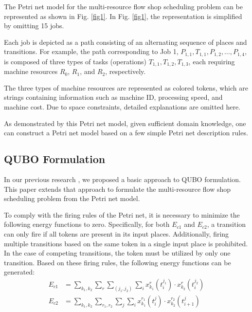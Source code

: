 \documentclass[conference]{IEEEtran}
\begin{document}
The Petri net model for the multi-resource flow shop scheduling problem can be represented as shown in Fig. \ref{fig1}. In Fig. \ref{fig1}, the representation is simplified by omitting 15 jobs.

Each job is depicted as a path consisting of an alternating sequence of places and transitions. For example, the path corresponding to Job 1, $P_{1,1}, T_{1,1}, P_{1,2}, \ldots, P_{1,4}$, is composed of three types of tasks (operations) $T_{1,1}, T_{1,2}, T_{1,3}$, each requiring machine resources $R_0$, $R_1$, and $R_2$, respectively.

The three types of machine resources are represented as colored tokens, which are strings containing information such as machine ID, processing speed, and machine cost. Due to space constraints, detailed explanations are omitted here.

As demonstrated by this Petri net model, given sufficient domain knowledge, one can construct a Petri net model based on a few simple Petri net description rules.

\subsection{QUBO Formulation}

In our previous research \cite{b2}, we proposed a basic approach to QUBO formulation. This paper extends that approach to formulate the multi-resource flow shop scheduling problem from the Petri net model.

To comply with the firing rules of the Petri net, it is necessary to minimize the following energy functions to zero. Specifically, for both $E_{c1}$ and $E_{c2}$, a transition can only fire if all tokens are present in its input places. Additionally, firing multiple transitions based on the same token in a single input place is prohibited. In the case of competing transitions, the token must be utilized by only one transition. Based on these firing rules, the following energy functions can be generated: 
\begin{align} 
E_{c1} &= \sum_{k_1,k_2} \sum_r \sum_{(j_1,j_2)} \sum_i x_{k_1}^{r}(t_{i}^{j_1}) \cdot x_{k_2}^{r}(t_{i}^{j_2}) \label{eqn:c1}\\ 
E_{c2} &= \sum_{k_1,k_2} \sum_{r_1,r_2} \sum_j \sum_i x_{k_1}^{r_1}(t_{i}^{j}) \cdot x_{k_2}^{r_2}(t_{i+1}^{j}) \label{eqn:c2} 
\end{align}
\end{document}
